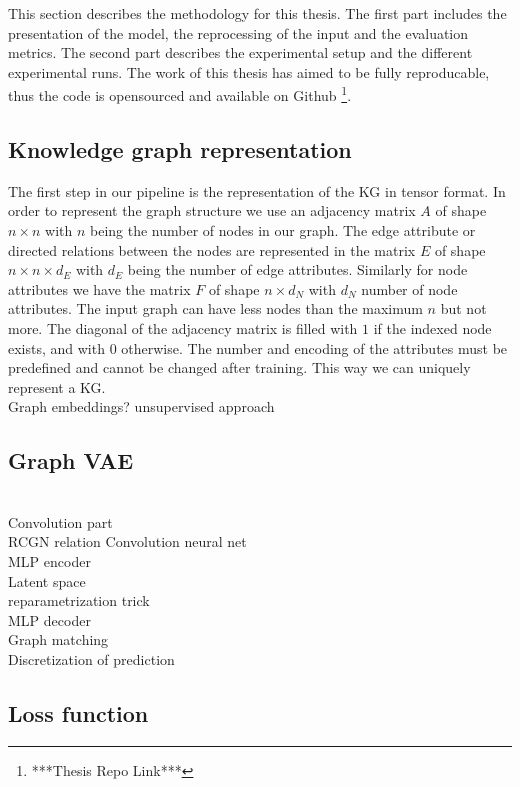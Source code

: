 This section describes the methodology for this thesis. The first part includes the presentation of the model, the reprocessing of the input and the evaluation metrics. The second part describes the experimental setup and the different experimental runs. The work of this thesis has aimed to be fully reproducable, thus the code is opensourced and available on Github \footnote{***Thesis Repo Link***}.

\subsection{Knowledge graph representation}

The first step in our pipeline is the representation of the KG in tensor format. In order to represent the graph structure we use an adjacency matrix $A$ of shape $n\times n$ with $n$ being the number of nodes in our graph. The edge attribute or directed relations between the nodes are represented in the matrix $E$ of shape $n\times n\times d_E$ with $d_E$ being the number of edge attributes. Similarly for node attributes we have the matrix $F$ of shape $n\times d_N$ with $d_N$ number of node attributes. The input graph can have less nodes than the maximum $n$ but not more. The diagonal of the adjacency matrix is filled with $1$ if the indexed node exists, and with $0$ otherwise. The number and encoding of the attributes must be predefined and cannot be changed after training. This way we can uniquely represent a KG.
\\


Graph embeddings? unsupervised approach

\subsection{Graph VAE}

\\Convolution part
\\RCGN relation Convolution neural net
\\MLP encoder
\\Latent space
\\reparametrization trick
\\MLP decoder
\\Graph matching
\\Discretization of prediction

\subsection{Loss function}

